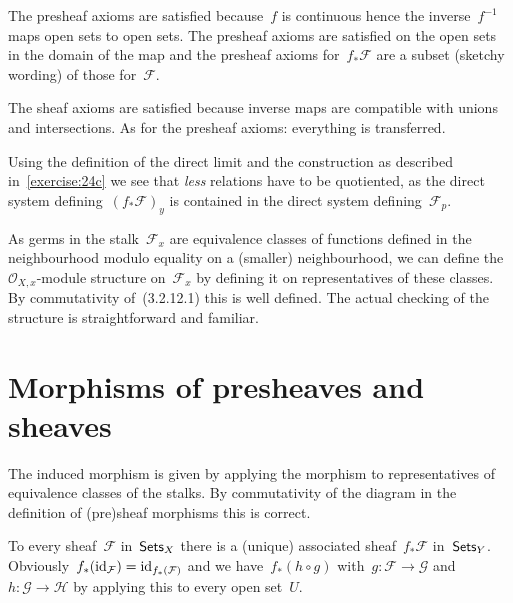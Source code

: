 \begin{exercise}
  The presheaf axioms are satisfied because~$f$ is continuous hence the inverse~$f^{-1}$ maps open sets to open sets. The presheaf axioms are satisfied on the open sets in the domain of the map and the presheaf axioms for~$f_*\mathcal{F}$ are a subset (sketchy wording) of those for~$\mathcal{F}$.

  The sheaf axioms are satisfied because inverse maps are compatible with unions and intersections. As for the presheaf axioms: everything is transferred.
\end{exercise}

\begin{exercise}
  Using the definition of the direct limit and the construction as described in~\autoref{exercise:24c} we see that \emph{less} relations have to be quotiented, as the direct system defining~$(f_*\mathcal{F})_y$ is contained in the direct system defining~$\mathcal{F}_p$.
\end{exercise}

\begin{exercise}
  As germs in the stalk~$\mathcal{F}_x$ are equivalence classes of functions defined in the neighbourhood modulo equality on a (smaller) neighbourhood, we can define the~$\mathcal{O}_{X,x}$\nobreakdash-module structure on~$\mathcal{F}_x$ by defining it on representatives of these classes. By commutativity of~(3.2.12.1) this is well defined. The actual checking of the structure is straightforward and familiar.
\end{exercise}


\section{Morphisms of presheaves and sheaves}

\begin{exercise}
  The induced morphism is given by applying the morphism to representatives of equivalence classes of the stalks. By commutativity of the diagram in the definition of (pre)sheaf morphisms this is correct.
\end{exercise}

\begin{exercise}
  To every sheaf~$\mathcal{F}$ in~$\mathsf{Sets}_X$ there is a (unique) associated sheaf~$f_*\mathcal{F}$ in~$\mathsf{Sets}_Y$. Obviously~$f_*(\mathrm{id}_\mathcal{F})=\mathrm{id}_{f_*(\mathcal{F})}$ and we have~$f_*(h\circ g)$ with~$g\colon\mathcal{F}\to\mathcal{G}$ and~$h\colon\mathcal{G}\to\mathcal{H}$ by applying this to every open set~$U$.
\end{exercise}

